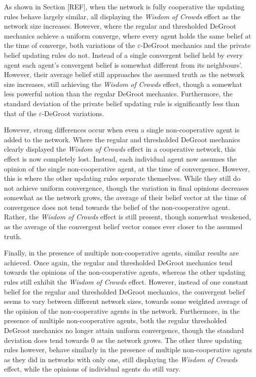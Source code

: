 \documentclass[a4paper, 12pt]{report}
\begin{document}
\noindent As shown in Section [REF], when the network is fully cooperative the updating rules behave largely similar, all displaying the \emph{Wisdom of Crowds} effect as the network size increases. However, where the regular and thresholded DeGroot mechanics achieve a uniform converge, where every agent holds the same belief at the time of converge, both variations of the $\varepsilon$-DeGroot mechanics and the private belief updating rules do not. Instead of a single convergent belief held by every agent each agent's convergent belief is somewhat different from its neighbours'. However, their average belief still approaches the assumed truth as the network size increases, still achieving the \emph{Wisdom of Crowds} effect, though a somewhat less powerful notion than the regular DeGroot mechanics. Furthermore, the standard deviation of the private belief updating rule is significantly less than that of the $\varepsilon$-DeGroot variations.

\noindent However, strong differences occur when even a single non-cooperative agent is added to the network. Where the regular and thresholded DeGroot mechanics clearly displayed the \emph{Wisdom of Crowds} effect in a cooperative network, this effect is now completely lost. Instead, each individual agent now assumes the opinion of the single non-cooperative agent, at the time of convergence. However, this is where the other updating rules separate themselves. While they still do not achieve uniform convergence, though the variation in final opinions decreases somewhat as the network grows, the average of their belief vector at the time of convergence does not tend towards the belief of the non-cooperative agent. Rather, the \emph{Wisdom of Crowds} effect is still present, though somewhat weakened, as the average of the convergent belief vector comes ever closer to the assumed truth.

\noindent Finally, in the presence of multiple non-cooperative agents, similar results are achieved. Once again, the regular and thresholded DeGroot mechanics tend towards the opinions of the non-cooperative agents, whereas the other updating rules still exhibit the \emph{Wisdom of Crowds} effect. However, instead of one constant belief for the regular and thresholded DeGroot mechanics, the convergent belief seems to vary between different network sizes, towards some weighted average of the opinion of the non-cooperative agents in the network. Furthermore, in the presence of multiple non-cooperative agents, both the regular thresholded DeGroot mechanics no longer attain uniform convergence, though the standard deviation does tend towards $0$ as the network grows. The other three updating rules however, behave similarly in the presence of multiple non-cooperative agents as they did in networks with only one, still displaying the \emph{Wisdom of Crowds} effect, while the opinions of individual agents do still vary.
\end{document}
